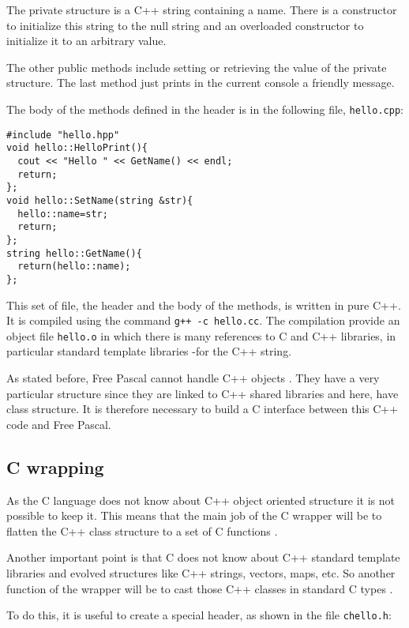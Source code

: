 \documentclass[A4paper]{article}
\begin{document}
The private structure is a C++ string containing a name. There is a
constructor to initialize this string to the null string and an overloaded
constructor to initialize it to an arbitrary value.

The other public methods include setting or retrieving the value of the
private structure. The last method just prints in the current console a
friendly message.

The body of the methods defined in the header is in the following file,
\verb|hello.cpp|:

\begin{verbatim}
#include "hello.hpp"
void hello::HelloPrint(){
  cout << "Hello " << GetName() << endl;
  return;
};
void hello::SetName(string &str){
  hello::name=str;
  return;
};
string hello::GetName(){
  return(hello::name);
};

\end{verbatim}

This set of file, the header and the body of the methods, is written in pure
C++. It is compiled using the command \verb|g++ -c hello.cc|. The compilation
provide an object file \verb|hello.o| in which there is many references to C
and C++ libraries, in particular standard template libraries -for the C++
string.

As stated before, Free Pascal cannot handle C++ objects
\cite{FPDoc,FPFor}. They have a very particular structure since they are
linked to C++ shared libraries and here, have class structure. It is therefore
necessary to build a C interface between this C++ code and Free Pascal.

\subsection{C wrapping}

As the C language does not know about C++ object oriented structure it is not
possible to keep it. This means that the main job of the C wrapper will be to
flatten the C++ class structure to a set of C functions
\cite{Rudy2006}. 

Another important point is that C does not know about C++ standard template
libraries and evolved structures like C++ strings, vectors, maps, etc. So
another function of the wrapper will be to cast those C++ classes in standard
C types \cite{Cline2006}.

To do this, it is useful to create a special header, as shown in the file
\verb|chello.h|:
\end{document}
